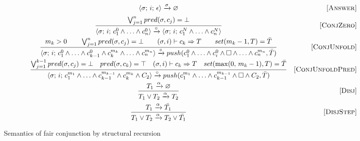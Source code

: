 \begin{figure}[h!]
\[\begin{array}{cr}

      {\langle \sigma;\, i;\, \epsilon \rangle \xrightarrow{\sigma} \varnothing}  
&     \mbox{[\textsc{Answer}]} \\[2mm]
\dfrac{\bigvee_{j=1}^n pred(\sigma, c_j) = \bot}
      {\langle \sigma;\, i;\, c_1^0 \land \ldots \land c_n^0 \rangle \xrightarrow{\circ} \langle \sigma;\, i;\, c_1^N \land \ldots \land c_n^N \rangle}
&     \mbox{[\textsc{ConjZero}]} \\[4mm]
\dfrac{m_k > 0 \qquad \bigvee_{j=1}^n pred(\sigma, c_j) = \bot \qquad (\sigma, i) \vdash c_k \Rightarrow T \qquad set(m_k - 1, T) = \bar{T}}
      {\langle \sigma;\, i;\, c_1^0 \land \ldots \land c_{k-1}^0 \land c_k^{m_k} \land \ldots \land c_n^{m_n} \rangle \xrightarrow{\circ} push(c_1^0 \land \ldots \land c_i^0 \land \Box \land \ldots \land c_n^{m_n}, \bar{T})}
&     \mbox{[\textsc{ConjUnfold}]} \\[4mm]
\dfrac{\bigvee_{j=1}^{k-1} pred(\sigma, c_j) = \bot \quad pred(\sigma, c_k) = \top \quad (\sigma, i) \vdash c_k \Rightarrow T \quad set(\max(0, \, m_k - 1), T) = \bar{T}}
      {\langle \sigma;\, i;\, c_1^{m_1} \land \ldots \land c_{k-1}^{m_{k-1}} \land c_k^{m_k} \land C_2 \rangle \xrightarrow{\circ} push(c_1^{m_1} \land \ldots \land c_{k-1}^{m_{k-1}} \land \Box \land C_2, \bar{T})}
&     \mbox{[\textsc{ConjUnfoldPred}]} \\[4mm]
\dfrac{T_1 \xrightarrow{\alpha} \varnothing}
      {T_1 \lor T_2 \xrightarrow{\alpha} T_2}
&     \mbox{[\textsc{Disj}]} \\[4mm]
\dfrac{T_1 \xrightarrow{\alpha} \bar{T_1}}
      {T_1 \lor T_2 \xrightarrow{\alpha} T_2 \lor\bar{T_1}}
&     \mbox{[\textsc{DisjStep}]}
\end{array}\]
\caption{Semantics of fair conjunction by structural recursion}
\label{fair:structural-recursion-semantics}
\end{figure}

